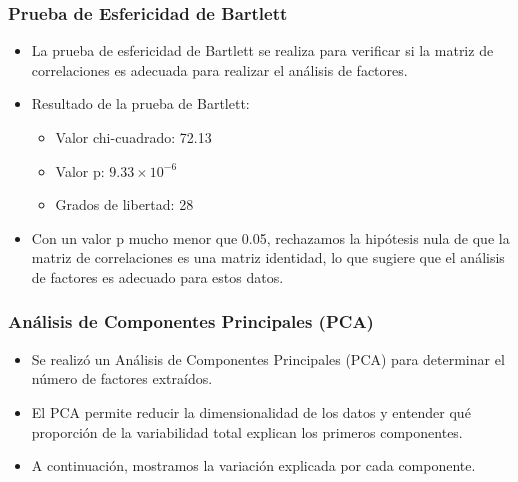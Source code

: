 \documentclass[
	11pt, %
]{beamer}
\begin{document}

\begin{frame}
\frametitle{Prueba de Esfericidad de Bartlett}

\begin{itemize}
    \item La prueba de esfericidad de Bartlett se realiza para verificar si la matriz de correlaciones es adecuada para realizar el análisis de factores.
    \item Resultado de la prueba de Bartlett:
    \begin{itemize}
        \item Valor chi-cuadrado: 72.13
        \item Valor p: \( 9.33 \times 10^{-6} \)
        \item Grados de libertad: 28
    \end{itemize}
    \item Con un valor p mucho menor que 0.05, rechazamos la hipótesis nula de que la matriz de correlaciones es una matriz identidad, lo que sugiere que el análisis de factores es adecuado para estos datos.
\end{itemize}

\end{frame}



\begin{frame}
\frametitle{Análisis de Componentes Principales (PCA)}

\begin{itemize}
    \item Se realizó un Análisis de Componentes Principales (PCA) para determinar el número de factores extraídos.
    \item El PCA permite reducir la dimensionalidad de los datos y entender qué proporción de la variabilidad total explican los primeros componentes.
    \item A continuación, mostramos la variación explicada por cada componente.
\end{itemize}

\end{frame}
\end{document}
